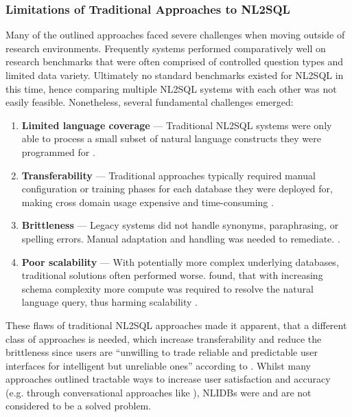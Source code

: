 \subsubsection{Limitations of Traditional Approaches to NL2SQL}

Many of the outlined approaches faced severe challenges when moving outside
of research environments. Frequently systems performed comparatively well on
research benchmarks that were often comprised of controlled question types and
limited data variety. Ultimately no standard benchmarks existed for NL2SQL in
this time, hence comparing multiple NL2SQL systems with each other was not
easily feasible. Nonetheless, several fundamental challenges emerged:

\begin{enumerate}
    \item \textbf{Limited language coverage} — Traditional NL2SQL systems were
        only able to process a small subset of natural language constructs
        they were programmed for \citep{StringKernels, UnnaturalQueryLanguage,
        Lunar, Ladder}.
    \item \textbf{Transferability} — Traditional approaches typically required
        manual configuration or training phases for each database they were
        deployed for, making cross domain usage expensive and time-consuming
        \citep{NLIDBs, Lunar}.
    \item \textbf{Brittleness} — Legacy systems did not handle synonyms,
        paraphrasing, or spelling errors. Manual adaptation and handling was
        needed to remediate. \citep{StringKernels, SQLizer}.
    \item \textbf{Poor scalability} — With potentially more complex underlying
        databases, traditional solutions often performed worse.
        \citeauthor*{GraphMatching} found, that with increasing schema
        complexity more compute was required to resolve the natural language
        query, thus harming scalability \citep{GraphMatching}.
\end{enumerate}

These flaws of traditional NL2SQL approaches made it apparent, that a different
class of approaches is needed, which increase transferability and reduce the
brittleness since users are ``unwilling to trade reliable and predictable user
interfaces for intelligent but unreliable ones'' according to
\cite{NLIDBTheory}. Whilst many approaches outlined tractable ways to increase
user satisfaction and accuracy (e.g. through conversational approaches like
\cite{Rendezvous}), NLIDBs were and are not considered to be a solved problem.
